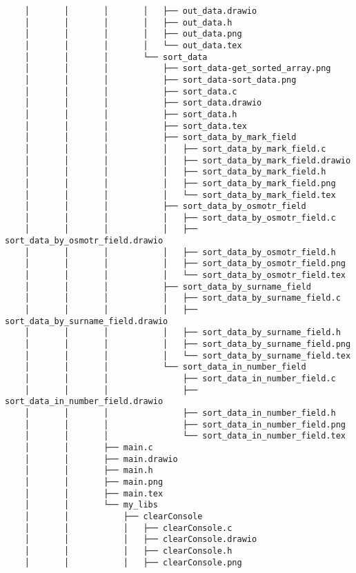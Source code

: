 \begin{verbatim}
    │       │       │       │   ├── out_data.drawio
    │       │       │       │   ├── out_data.h
    │       │       │       │   ├── out_data.png
    │       │       │       │   └── out_data.tex
    │       │       │       └── sort_data
    │       │       │           ├── sort_data-get_sorted_array.png
    │       │       │           ├── sort_data-sort_data.png
    │       │       │           ├── sort_data.c
    │       │       │           ├── sort_data.drawio
    │       │       │           ├── sort_data.h
    │       │       │           ├── sort_data.tex
    │       │       │           ├── sort_data_by_mark_field
    │       │       │           │   ├── sort_data_by_mark_field.c
    │       │       │           │   ├── sort_data_by_mark_field.drawio
    │       │       │           │   ├── sort_data_by_mark_field.h
    │       │       │           │   ├── sort_data_by_mark_field.png
    │       │       │           │   └── sort_data_by_mark_field.tex
    │       │       │           ├── sort_data_by_osmotr_field
    │       │       │           │   ├── sort_data_by_osmotr_field.c
    │       │       │           │   ├── sort_data_by_osmotr_field.drawio
    │       │       │           │   ├── sort_data_by_osmotr_field.h
    │       │       │           │   ├── sort_data_by_osmotr_field.png
    │       │       │           │   └── sort_data_by_osmotr_field.tex
    │       │       │           ├── sort_data_by_surname_field
    │       │       │           │   ├── sort_data_by_surname_field.c
    │       │       │           │   ├── sort_data_by_surname_field.drawio
    │       │       │           │   ├── sort_data_by_surname_field.h
    │       │       │           │   ├── sort_data_by_surname_field.png
    │       │       │           │   └── sort_data_by_surname_field.tex
    │       │       │           └── sort_data_in_number_field
    │       │       │               ├── sort_data_in_number_field.c
    │       │       │               ├── sort_data_in_number_field.drawio
    │       │       │               ├── sort_data_in_number_field.h
    │       │       │               ├── sort_data_in_number_field.png
    │       │       │               └── sort_data_in_number_field.tex
    │       │       ├── main.c
    │       │       ├── main.drawio
    │       │       ├── main.h
    │       │       ├── main.png
    │       │       ├── main.tex
    │       │       └── my_libs
    │       │           ├── clearConsole
    │       │           │   ├── clearConsole.c
    │       │           │   ├── clearConsole.drawio
    │       │           │   ├── clearConsole.h
    │       │           │   ├── clearConsole.png

\end{verbatim}
